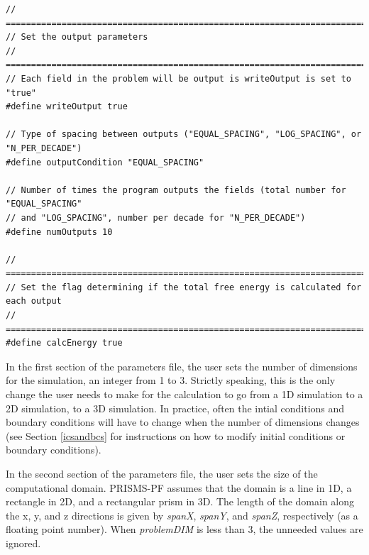 \documentclass[10pt]{article} %
\begin{document}
\begin{lstlisting}
// =================================================================================
// Set the output parameters
// =================================================================================
// Each field in the problem will be output is writeOutput is set to "true"
#define writeOutput true

// Type of spacing between outputs ("EQUAL_SPACING", "LOG_SPACING", or "N_PER_DECADE")
#define outputCondition "EQUAL_SPACING"

// Number of times the program outputs the fields (total number for "EQUAL_SPACING"
// and "LOG_SPACING", number per decade for "N_PER_DECADE")
#define numOutputs 10

// =================================================================================
// Set the flag determining if the total free energy is calculated for each output
// =================================================================================
#define calcEnergy true
\end{lstlisting}
\normalsize

In the first section of the parameters file, the user sets the number of dimensions for the simulation, an integer from 1 to 3. Strictly speaking, this is the only change the user needs to make for the calculation to go from a 1D simulation to a 2D simulation, to a 3D simulation. In practice, often the intial conditions and boundary conditions will have to change when the number of dimensions changes (see Section \ref{icsandbcs} for instructions on how to modify initial conditions or boundary conditions).

In the second section of the parameters file, the user sets the size of the computational domain. PRISMS-PF assumes that the domain is a line in 1D, a rectangle in 2D, and a rectangular prism in 3D. The length of the domain along the x, y, and z directions is given by \emph{spanX}, \emph{spanY}, and \emph{spanZ}, respectively (as a floating point number). When \emph{problemDIM} is less than 3, the unneeded values are ignored.
\end{document}
